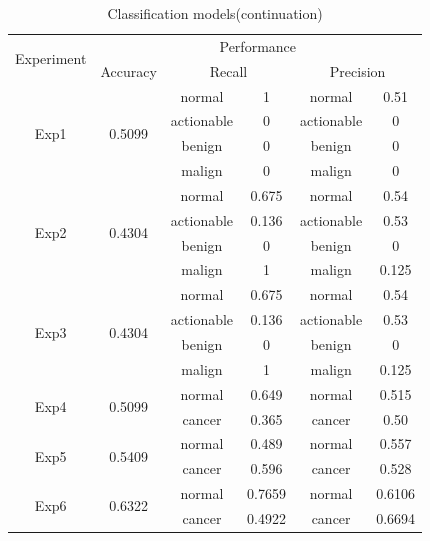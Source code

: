 \begin{table}[H]
    \centering
    \begin{tabular}{|c|c|c|c|c|c|}
        \hline
        \multirow{2}{5em}{Experiment}  & \multicolumn{5}{c|}{Performance}
        \\ \cline{2-6}
         & Accuracy & \multicolumn{2}{c|}{Recall} & \multicolumn{2}{c|}{Precision} 
         \\ \cline{3-6}
        \hline \hline
        \multirow{4}{5em}{Exp1} & \multirow{4}{5em}{0.5099} & normal & 1 & normal & 0.51 \\ \cline{3-6}
        & & actionable & 0 & actionable & 0 \\ \cline{3-6}
        & & benign & 0 & benign & 0 \\ \cline{3-6}
         & & malign & 0 & malign & 0 \\ \cline{3-6}
        \hline
        
        \multirow{4}{5em}{Exp2} & \multirow{4}{5em}{0.4304} & normal & 0.675 & normal & 0.54 \\ \cline{3-6}
        & & actionable & 0.136 & actionable & 0.53 \\ \cline{3-6}
        & & benign & 0 & benign & 0 \\ \cline{3-6}
        & & malign & 1 & malign & 0.125 \\ \cline{3-6}
        \hline
        
        \multirow{4}{5em}{Exp3} & \multirow{4}{5em}{0.4304} & normal & 0.675 & normal & 0.54 \\ \cline{3-6}
        & & actionable & 0.136 & actionable & 0.53 \\ \cline{3-6}
        & & benign & 0 & benign & 0 \\ \cline{3-6}
        & & malign & 1 & malign & 0.125 \\ \cline{3-6}
        \hline
        
        \multirow{2}{5em}{Exp4} & \multirow{2}{5em}{0.5099} & normal & 0.649 & normal & 0.515 \\ \cline{3-6}
        & & cancer & 0.365 & cancer & 0.50 \\ \cline{3-6}
        \hline
        
        \multirow{2}{5em}{Exp5} & \multirow{2}{5em}{0.5409} & normal & 0.489 & normal & 0.557 \\ \cline{3-6}
        & & cancer & 0.596 & cancer & 0.528 \\ \cline{3-6}
        \hline
        
        \multirow{2}{5em}{Exp6} & \multirow{2}{5em}{0.6322} & normal & 0.7659 & normal & 0.6106 \\ \cline{3-6}
        & & cancer & 0.4922 & cancer & 0.6694 \\ \cline{3-6}
        \hline
    \end{tabular}
    \caption{Classification models(continuation)}
    \label{tab:tab6}
\end{table}

